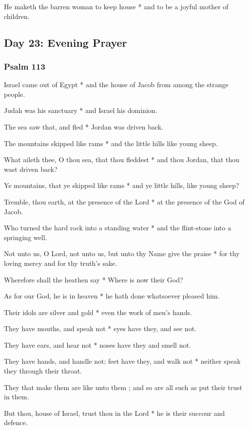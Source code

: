 He maketh the barren woman to keep house * and to be a joyful mother of children.

\subsection{Day 23: Evening Prayer}

\subsubsection{Psalm 113}


 Israel came out of Egypt * and the house of Jacob from among the strange people.

Judah was his sanctuary * and Israel his dominion.

The sea saw that, and fled * Jordan was driven back.

The mountains skipped like rams * and the little hills like young sheep.

What aileth thee, O thou sea, that thou fleddest * and thou Jordan, that thou wast driven back?

Ye mountains, that ye skipped like rams * and ye little hills, like young sheep?

Tremble, thou earth, at the presence of the Lord * at the presence of the God of Jacob.

Who turned the hard rock into a standing water * and the flint-stone into a springing well.

Not unto us, O Lord, not unto us, but unto thy Name give the praise * for thy loving mercy and for thy truth's sake.

Wherefore shall the heathen say * Where is now their God?

As for our God, he is in heaven * he hath done whatsoever pleased him.

Their idols are silver and gold * even the work of men's hands.

They have mouths, and speak not * eyes have they, and see not.

They have ears, and hear not * noses have they and smell not.

They have hands, and handle not; feet have they, and walk not * neither speak they through their throat.

They that make them are like unto them ; and so are all such as put their trust in them.

But thou, house of Israel, trust thou in the Lord * he is their succour and defence.

